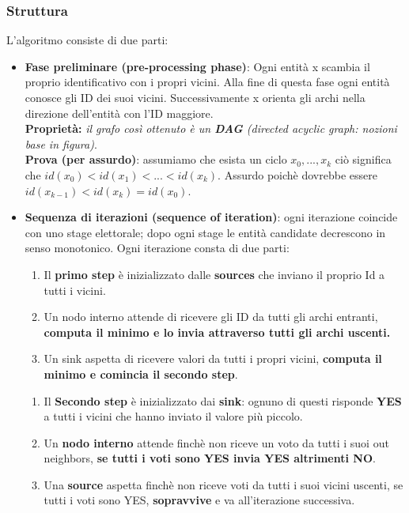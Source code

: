 \documentclass[12pt]{article}
\begin{document}
		\subsubsection{Struttura}
			L'algoritmo consiste di due parti:
			\begin{itemize}
				\item \textbf{Fase preliminare (pre-processing phase)}: Ogni entità x scambia il proprio identificativo con i propri vicini. Alla fine di questa fase ogni entità conosce gli ID dei suoi vicini. Successivamente x orienta gli archi nella direzione dell'entità con l'ID maggiore.\\ \textbf{Proprietà:} \textit{il grafo  così ottenuto è un \textbf{DAG} (directed acyclic graph: nozioni base in figura)}.\\
				\textbf{Prova (per assurdo)}: assumiamo che esista un ciclo $x_0,...,x_k$ ciò significa che $id(x_0)<id(x_1)<...<id(x_k)$. Assurdo poichè dovrebbe essere $id(x_{k-1})<id(x_{k})=id(x_0) 	$.	
				\item \textbf{Sequenza di iterazioni (sequence of iteration)}: ogni iterazione coincide con uno stage elettorale; dopo ogni stage le entità candidate decrescono in senso monotonico. Ogni iterazione consta di due parti:
				\begin{enumerate}
					\item Il \textbf{\textbf{primo step}} è inizializzato dalle \textbf{sources} che inviano il proprio Id a tutti i vicini.
					\item Un nodo interno attende di ricevere gli ID da tutti gli archi entranti, \textbf{computa il minimo e lo invia attraverso tutti gli archi uscenti.} 
					\item Un sink aspetta di ricevere valori da tutti i propri vicini, \textbf{computa il minimo e comincia il secondo step}. 
				\end{enumerate} 
				\begin{enumerate}
					\item Il \textbf{\textbf{Secondo step}} è inizializzato dai \textbf{sink}: ognuno di questi risponde \textbf{YES} a tutti i vicini che hanno inviato il valore più piccolo. 
					\item Un \textbf{nodo interno} attende finchè non riceve un voto da tutti i suoi out neighbors, \textbf{se tutti i voti sono YES invia YES altrimenti NO}.
					\item Una \textbf{source} aspetta finchè non riceve voti da tutti i suoi vicini uscenti, se tutti i voti sono YES, \textbf{sopravvive} e va all'iterazione successiva.

\end{enumerate}
\end{itemize}
\end{document}
